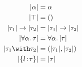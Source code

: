 \begin{align*}
  \im \alpha                    &= \alpha \\
  \im \top                      &= () \\
  \im {\tau_1} \to \im {\tau_2} &= \im {\tau_1} \to \im {\tau_2} \\
  \im {\for \alpha \tau}        &= \for \alpha \im \tau \\
  \im {\tau_1 \andop \tau_2}    &= \pair {\im {\tau_1}} {\im {\tau_2}} \\
  \im {\recty l \tau}           &= \im \tau
\end{align*}